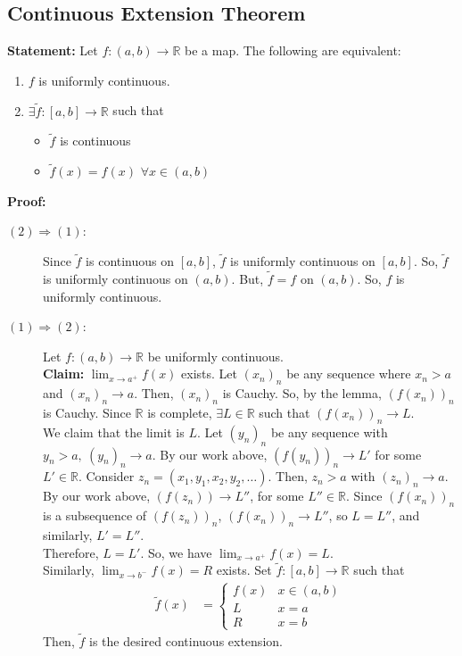 \documentclass[10pt]{extarticle}
\newcommand{\R}{\mathbb{R}}
\begin{document}
  \subsection{Continuous Extension Theorem}%
    \textbf{Statement:} Let $f: (a,b) \rightarrow \R$ be a map. The following are equivalent:
    \begin{enumerate}[(1)]
      \item $f$ is uniformly continuous.
      \item $\exists \tilde{f}: [a,b] \rightarrow \R$ such that
        \begin{itemize}
          \item $\tilde{f}$ is continuous
          \item $\tilde{f}(x) = f(x)$ $\forall x\in (a,b)$
        \end{itemize}
    \end{enumerate}
    \textbf{Proof:}
    \begin{description}
      \item[$(2) \Rightarrow (1)$:] Since $\tilde{f}$ is continuous on $[a,b]$, $\tilde{f}$ is uniformly continuous on $[a,b]$. So, $\tilde{f}$ is uniformly continuous on $(a,b)$. But, $\tilde{f} = f$ on $(a,b)$. So, $f$ is uniformly continuous.
      \item[$(1) \Rightarrow (2)$:] Let $f: (a,b) \rightarrow \R$ be uniformly continuous.\\

        \textbf{Claim:} $\lim_{x\rightarrow a^{+}}f(x)$ exists. Let $(x_n)_n$ be any sequence where $x_n > a$ and $(x_n)_n \rightarrow a$. Then, $(x_n)_n$ is Cauchy. So, by the lemma, $(f(x_n))_n$ is Cauchy. Since $\R$ is complete, $\exists L\in \R$ such that $\left(f(x_n)\right)_n \rightarrow L$.\\

        We claim that the limit is $L$. Let $(y_n)_n$ be any sequence with $y_n > a,~(y_n)_n\rightarrow a$. By our work above, $\left(f(y_n)\right)_n \rightarrow L'$ for some $L'\in \R$. Consider $z_n = (x_1,y_1,x_2,y_2,\dots)$. Then, $z_n > a$ with $(z_n)_n \rightarrow a$. By our work above, $\left(f(z_n)\right) \rightarrow L''$, for some $L''\in \R$. Since $(f(x_n))_n$ is a subsequence of $(f(z_n))_n$, $\left(f(x_n)\right)_n \rightarrow L''$, so $L = L''$, and similarly, $L' = L''$.\\

        Therefore, $L = L'$. So, we have $\lim_{x\rightarrow a^+} f(x) = L$.\\

        Similarly, $\lim_{x\rightarrow b^-}f(x) = R$ exists. Set $\tilde{f}: [a,b] \rightarrow \R$ such that
        \begin{align*}
          \tilde{f}(x) &= \begin{cases}
            f(x) & x\in (a,b)\\
            L & x=a\\
            R & x=b
          \end{cases}
        \end{align*}
        Then, $\tilde{f}$ is the desired continuous extension.
    \end{description}
\end{document}
